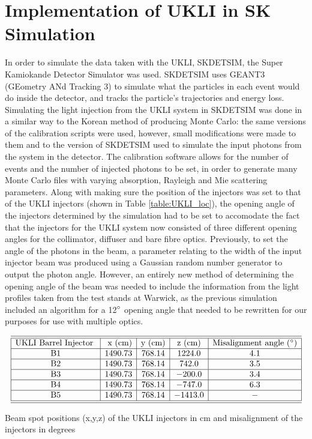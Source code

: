 \section{Implementation of UKLI in SK Simulation}
In order to simulate the data taken with the UKLI, SKDETSIM, the Super Kamiokande Detector Simulator was used. SKDETSIM uses GEANT3 (GEometry ANd Tracking 3) to simulate what the particles in each event would do inside the detector, and tracks the particle's trajectories and energy loss. Simulating the light injection from the UKLI system in SKDETSIM was done in a similar way to the Korean method of producing Monte Carlo: the same versions of the calibration scripts were used, however, small modifications were made to them and to the version of SKDETSIM used to simulate the input photons from the system in the detector. The calibration software allows for the number of events and the number of injected photons to be set, in order to generate many Monte Carlo files with varying absorption, Rayleigh and Mie scattering parameters. 
\newline
Along with making sure the position of the injectors was set to that of the UKLI injectors (shown in Table \ref{table:UKLI_loc}), the opening angle of the injectors determined by the simulation had to be set to accomodate the fact that the injectors for the UKLI system now consisted of three different opening angles for the collimator, diffuser and bare fibre optics. Previously, to set the angle of the photons in the beam, a parameter relating to the width of the input injector beam was produced using a Gaussian random number generator to output the photon angle. However, an entirely new method of determining the opening angle of the beam was needed to include the information from the light profiles taken from the test stands at Warwick, as the previous simulation included an algorithm for a 12$\degree$ opening angle that needed to be rewritten for our purposes for use with multiple optics. 

\begin{table}[htp]
    $$
\begin{array}{|c|c|c|c|c|c|}  
    \hline \hline{\text {UKLI Barrel Injector }} & {\text { x (cm)}} & {\text {y (cm)}} & {\text {z (cm)}} & {\text{Misalignment angle ($\degree$)}}  \tabularnewline
    \hline \text { B1 } & 1490.73 & 768.14 & 1224.0 & 4.1 \\
    \hline \text { B2 } & 1490.73 & 768.14 & 742.0 & 3.5 \\
    \hline \text { B3 } & 1490.73 & 768.14 & -200.0 & 3.4 \\
    \hline \text { B4 } & 1490.73 & 768.14 & -747.0 & 6.3 \\
    \hline \text { B5 } & 1490.73 & 768.14 &  -1413.0 & - \\
    \hline \hline 
\end{array}
    $$
\caption{Beam spot positions (x,y,z) of the UKLI injectors in cm and misalignment of the injectors in degrees} 
\label{table:UKLI_loc}
\end{table}

